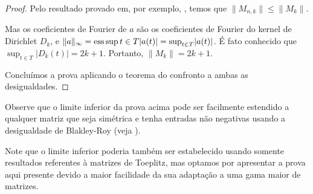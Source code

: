 \begin{proof}
  Pelo resultado provado em, por exemplo, \cite[p. 52]{bottcher}, temos que $\| M_{n,k} \| \le \| M_k \|$.

  Mas os coeficientes de Fourier de $a$ são os coeficientes de Fourier do kernel de Dirichlet $D_k$, e $\| a \|_{\infty} = \operatorname*{ess\,sup}{t \in T} \lvert a(t)\rvert = \sup_{t \in T} \lvert a(t)\rvert$. É fato conhecido que $\sup_{t \in T} \lvert D_k(t)\rvert = 2k + 1$. Portanto, $\| M_k \| = 2k + 1$.

  Concluímos a prova aplicando o teorema do confronto a ambas as desigualdades. \end{proof}

Observe que o limite inferior da prova acima pode ser facilmente estendido a qualquer matriz que seja simétrica e tenha entradas não negativas usando a desigualdade de Blakley-Roy (veja \cite{blakley-roy}).

Note que o limite inferior poderia também ser estabelecido usando somente resultados referentes à matrizes de Toeplitz, mas optamos por apresentar a prova aqui presente devido a maior facilidade da sua adaptação a uma gama maior de matrizes.
